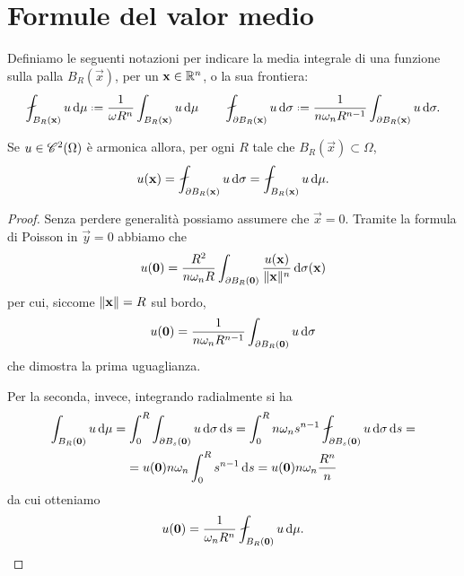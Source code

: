 \section{Formule del valor medio}
\label{sec:formule-valor-medio}
Definiamo le seguenti notazioni per indicare la media integrale di una funzione sulla palla $B_R(\vec x)$, per un $\vec x\in\R^n$, o la sua frontiera:
\begin{equation}
    \avint_{B_R(\vec x)}u\,\dd\mu\defeq\frac1{\omega R^n}\int_{B_R(\vec x)}u\,\dd\mu
    \qquad
    \avint_{\boundary B_R(\vec x)}u\,\dd\sigma\defeq\frac1{n\omega_nR^{n-1}}\int_{\boundary B_R(\vec x)}u\,\dd\sigma.
\end{equation}
\begin{teorema} \label{t:valor-medio-laplace}
    Se $u\in\cont[2]{\Omega}$ è armonica allora, per ogni $R$ tale che $B_R(\vec x)\subset\Omega$,
    \begin{equation}
        u(\vec x)=\avint_{\boundary B_R(\vec x)} u\,\dd\sigma=\avint_{B_R(\vec x)} u\,\dd\mu.
    \end{equation}
\end{teorema}
\begin{proof}
    Senza perdere generalità possiamo assumere che $\vec x=0$.
    Tramite la formula di Poisson in $\vec y=0$ abbiamo che
    \begin{equation}
        u(\vec 0)=\frac{R^2}{n\omega_n R}\int_{\boundary B_R(\vec 0)}\frac{u(\vec x)}{\norm{\vec x}^n}\,\dd\sigma(\vec x)
    \end{equation}
    per cui, siccome $\norm{\vec x}=R$ sul bordo,
    \begin{equation}
        u(\vec 0)=\frac1{n\omega_n R^{n-1}}\int_{\boundary B_R(\vec 0)}u\,\dd\sigma
    \end{equation}
    che dimostra la prima uguaglianza.
    
    Per la seconda, invece, integrando radialmente si ha
    \begin{multline}
        \int_{B_R(\vec 0)} u\,\dd\mu=
        \int_0^R\int_{\boundary B_s(\vec 0)} u\,\dd\sigma\,\dd s=
        \int_0^R n\omega_n s^{n-1}\avint_{\boundary B_s(\vec 0)} u\,\dd\sigma\,\dd s=\\=
        u(\vec 0)n\omega_n \int_0^R s^{n-1}\,\dd s=
        u(\vec 0)n\omega_n\frac{R^n}{n}
    \end{multline}
    da cui otteniamo
    \begin{equation}
        u(\vec 0)=\frac1{\omega_nR^n}\avint_{B_R(\vec 0)} u\,\dd\mu.\qedhere
    \end{equation}
\end{proof}
